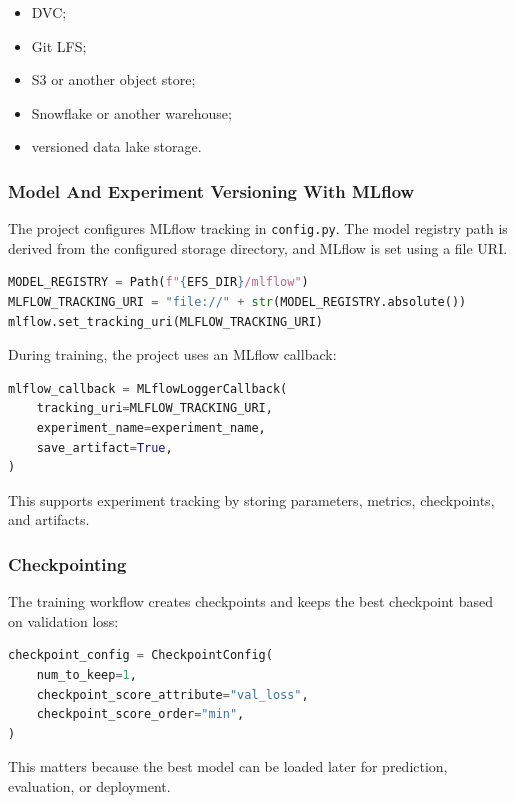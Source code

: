 \documentclass[11pt,a4paper]{article}
\begin{document}
\begin{itemize}
    \item DVC;
    \item Git LFS;
    \item S3 or another object store;
    \item Snowflake or another warehouse;
    \item versioned data lake storage.
\end{itemize}

\subsubsection{Model And Experiment Versioning With MLflow}

The project configures MLflow tracking in \texttt{config.py}. The model registry path is derived from the configured storage directory, and MLflow is set using a file URI.

\begin{lstlisting}[style=projectcode,language=Python]
MODEL_REGISTRY = Path(f"{EFS_DIR}/mlflow")
MLFLOW_TRACKING_URI = "file://" + str(MODEL_REGISTRY.absolute())
mlflow.set_tracking_uri(MLFLOW_TRACKING_URI)
\end{lstlisting}

During training, the project uses an MLflow callback:

\begin{lstlisting}[style=projectcode,language=Python]
mlflow_callback = MLflowLoggerCallback(
    tracking_uri=MLFLOW_TRACKING_URI,
    experiment_name=experiment_name,
    save_artifact=True,
)
\end{lstlisting}

This supports experiment tracking by storing parameters, metrics, checkpoints, and artifacts.

\subsubsection{Checkpointing}

The training workflow creates checkpoints and keeps the best checkpoint based on validation loss:

\begin{lstlisting}[style=projectcode,language=Python]
checkpoint_config = CheckpointConfig(
    num_to_keep=1,
    checkpoint_score_attribute="val_loss",
    checkpoint_score_order="min",
)
\end{lstlisting}

This matters because the best model can be loaded later for prediction, evaluation, or deployment.
\end{document}
